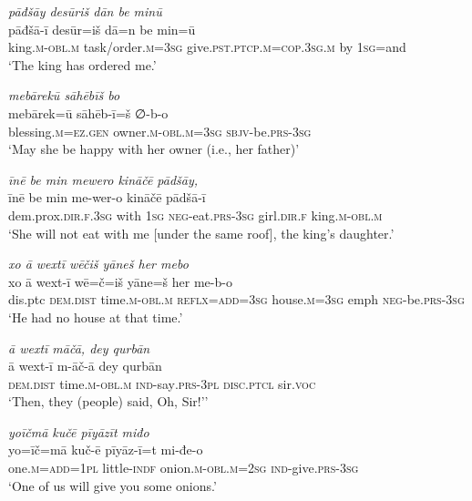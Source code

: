 \ea \label{ŽP.209}
\textit{pāđšāy desūriš dān be minū} \\ 
\gll pāđšā-ī desūr=iš dā=n be min=ū \\ 
 king\textsc{.m}\textsc{-obl}\textsc{.m} task/order\textsc{.m}\textsc{=3sg} give\textsc{.pst}\textsc{.ptcp}\textsc{.m}\textsc{=cop}\textsc{.3sg}\textsc{.m} by \textsc{1sg}=and \\ 
\glt `The king has ordered me.'
\z 
 
\ea \label{ŽP.211}
\textit{mebārekū sāhēbīš bo} \\ 
\gll mebārek=ū sāhēb-ī=š ∅-b-o \\ 
 blessing\textsc{.m}\textsc{\textsc{=ez.gen}} owner\textsc{.m}\textsc{-obl}\textsc{.m}\textsc{=3sg} \textsc{sbjv-}be\textsc{.prs}\textsc{-3sg} \\ 
\glt `May she be happy with her owner (i.e., her father)'
\z 
 
\ea \label{ŽP.213}
\textit{īnē be min mewero kināčē pādšāy,} \\ 
\gll īnē be min me-wer-o kināčē pādšā-ī \\ 
 dem.prox\textsc{.dir}\textsc{.f}\textsc{.3sg} with \textsc{1sg} \textsc{neg-}eat\textsc{.prs}\textsc{-3sg} girl\textsc{.dir}\textsc{.f} king\textsc{.m}\textsc{-obl}\textsc{.m} \\ 
\glt `She will not eat with me [under the same roof], the king’s daughter.'
\z 
 
\ea \label{ŽP.219}
\textit{xo ā wextī wēčiš yāneš her mebo} \\ 
\gll xo ā wext-ī wē=č=iš yāne=š her me-b-o \\ 
 dis.ptc \textsc{dem.dist} time\textsc{.m}\textsc{-obl}\textsc{.m} \textsc{reflx}\textsc{=add}\textsc{=3sg} house\textsc{.m}\textsc{=3sg} emph \textsc{neg-}be\textsc{.prs}\textsc{-3sg} \\ 
\glt `He had no house at that time.'
\z 
 
\ea \label{ŽP.220}
\textit{ā wextī māčā, dey qurbān} \\ 
\gll ā wext-ī m-āč-ā dey qurbān \\ 
 \textsc{dem.dist} time\textsc{.m}\textsc{-obl}\textsc{.m} \textsc{ind-}say\textsc{.prs}\textsc{-3pl} \textsc{disc.ptcl} sir.\textsc{voc} \\ 
\glt `Then, they (people) said, Oh, Sir!’'
\z 
 
\ea \label{ŽP.229}
\textit{yoīčmā kučē pīyāzīt miđo} \\ 
\gll yo=īč=mā kuč-ē pīyāz-ī=t mi-đe-o \\ 
 one\textsc{.m}\textsc{=add}\textsc{=1pl} little\textsc{-indf} onion\textsc{.m}\textsc{-obl}\textsc{.m}\textsc{=\textsc{2sg}} \textsc{ind-}give\textsc{.prs}\textsc{-3sg} \\ 
\glt `One of us will give you some onions.'
\z 
 
